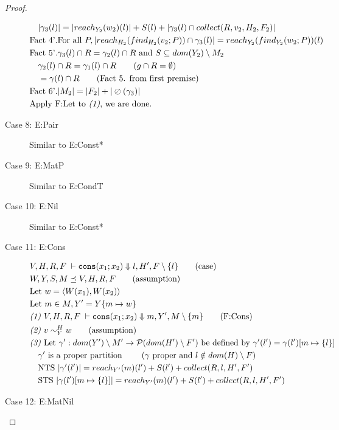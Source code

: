 \documentclass[11pt]{article}
\newcommand{\veq}[4]{#3 \sim^{#1}_{#2} #4}
\newcommand{\oh}[1]{\oslash(#1)}
\theoremstyle{definition}
\begin{document}
\begin{proof}
\begin{description}
\begin{align*}
		&\quad|\gamma_3(l)| = |reach_{Y_2}(w_2)(l)| + S(l) + |\gamma_3(l) \cap collect(R,v_2,H_2,F_2)|\\
		&\text{Fact 4'}. \text{For all } P, |reach_{H_2}(find_{H_2}(v_2;P)) \cap \gamma_3(l)| = 
				reach_{Y_2}(find_{Y_2}(w_2;P))(l)\\
		&\text{Fact 5'}. \gamma_3(l) \cap R = \gamma_2(l) \cap R \text{ and } 
			S \subseteq dom(Y_2) \setminus M_2\\
		&\quad \gamma_2(l) \cap R = \gamma_1(l) \cap R \tag{$g \cap R = \emptyset$}\\
		&\quad = \gamma(l) \cap R \tag{Fact 5. from first premise}\\
		&\text{Fact 6'}. |M_2| = |F_2| + |\oh{\gamma_3}|\\
		&\text{Apply F:Let to \emph{(1)}, we are done.}
  \end{align*}
	\item[Case 8: E:Pair]
  Similar to E:Const*
  \item[Case 9: E:MatP]
  Similar to E:CondT
  \item[Case 10: E:Nil]
  Similar to E:Const*
  \item[Case 11: E:Cons]
  \begin{align*}
		&V,H,R,F \; \vdash \consexcst{x_1}{x_2} \Downarrow l,H' ,F \setminus \{l\} \tag{case}\\
		&W,Y,S,M \preceq V,H,R,F \tag{assumption}\\
		&\text{Let } w = \pairexcst{W(x_1)}{W(x_2)}\\
		&\text{Let } m \in M, Y' = Y\{m \mapsto w\}\\
		&\emph{(1) }V,H,R,F \; \vdash
			\consexcst{x_1}{x_2} \Downarrow m,Y' ,M \setminus \{m\} \tag{F:Cons}\\
		&\emph{(2) } \veq{H}{Y}{v}{w} \tag{assumption}\\
		&\emph{(3) } \text{Let } \gamma' : dom(Y') \setminus M' \to \mathcal{P}(dom(H')\setminus F')
			\text{ be defined by } \gamma'(l') = \gamma(l')[m \mapsto \{l\}]\\
		&\quad \gamma' \text{ is a proper partition } 
			\tag{$\gamma$ proper and $l \notin dom(H) \setminus F$}\\
		&\quad \text{NTS } |\gamma'(l')| = reach_{Y'}(m)(l') + S(l') + collect(R,l,H',F')\\
		&\quad \text{STS } |\gamma(l')[m \mapsto \{l\}]| = 
			reach_{Y'}(m)(l') + S(l') + collect(R,l,H',F')\\
	\end{align*}
  \item[Case 12: E:MatNil]

\end{description}
\end{proof}
\end{document}
